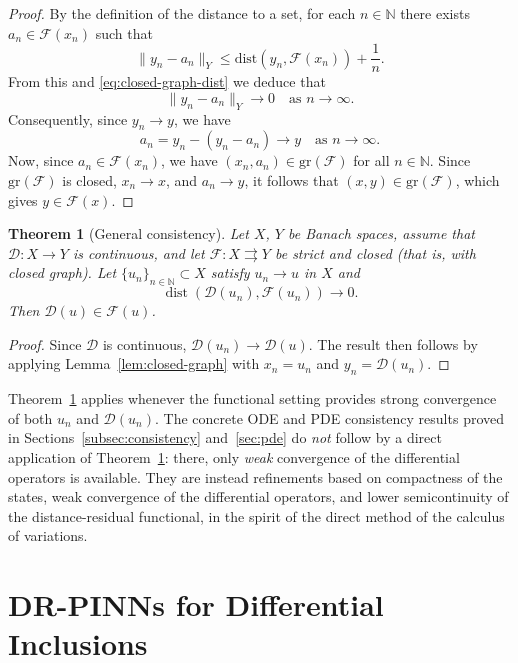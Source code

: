 \documentclass[11pt]{elsarticle}
\newtheorem{theorem}{Theorem}[section]
\theoremstyle{definition}
\theoremstyle{remark}
\numberwithin{equation}{section}
\def\dist{\operatorname{dist}}
\begin{document}
	\begin{proof}
		By the definition of the distance to a set,
		for each $n \in \mathbb{N}$ there exists $a_n \in \mathcal{F}(x_n)$ such that
		$$
		\|y_n - a_n\|_Y \leq \text{dist}(y_n, \mathcal{F}(x_n)) + \frac{1}{n}.
		$$
		From this and \eqref{eq:closed-graph-dist} we deduce that
		\[
		\|y_n - a_n\|_Y \to 0 \quad \text{as } n \to \infty.
		\]
		Consequently, since $y_n \to y$, we have 
		\[
		a_n = y_n - (y_n - a_n) \to y \quad \text{as } n \to \infty.
		\]
		Now, since $a_n \in \mathcal{F}(x_n)$, we have $(x_n, a_n) \in \text{gr}(\mathcal{F})$ for all $n\in\mathbb{N}$.
		Since $\text{gr}(\mathcal{F})$ is closed, $x_n \to x$, and $a_n \to y$, it follows that $(x, y) \in \text{gr}(\mathcal{F})$, 
		which gives $y \in \mathcal{F}(x)$.
	\end{proof}
	
	\begin{theorem}[General consistency]\label{thm:general-consistency}
		Let $X$, $Y$ be Banach spaces, assume that $\mathcal{D}:X\to Y$ is continuous,
		and let $\mathcal{F}:X\rightrightarrows Y$ be strict and closed (that is, with closed graph).
		Let $\{u_n\}_{n\in\mathbb{N}}\subset X$ satisfy $u_n\to u$ in $X$ and
		\[
		\dist(\mathcal{D}(u_n),\mathcal{F}(u_n))\to 0.
		\]
		Then
		$\mathcal{D}(u)\in\mathcal{F}(u)$.
	\end{theorem}
	
	\begin{proof}
		Since $\mathcal{D}$ is continuous, $\mathcal{D}(u_n)\to\mathcal{D}(u)$. The result then follows by applying Lemma~\ref{lem:closed-graph} with $x_n=u_n$ and $y_n=\mathcal{D}(u_n)$.
	\end{proof}
	
	Theorem~\ref{thm:general-consistency} applies whenever the functional
	setting provides strong convergence of both $u_n$ and
	$\mathcal{D}(u_n)$.  The concrete ODE and PDE consistency results proved in
	Sections~\ref{subsec:consistency} and~\ref{sec:pde} do \emph{not} follow
	by a direct application of Theorem~\ref{thm:general-consistency}: there,
	only \emph{weak} convergence of the differential operators is available.
	They are instead refinements based on compactness of the states, weak
	convergence of the differential operators, and lower semicontinuity of the
	distance-residual functional, in the spirit of the direct method of the
	calculus of variations.
	
	
	\section{DR-PINNs for Differential Inclusions}
	\label{sec:distance-residual}
	
\end{document}
